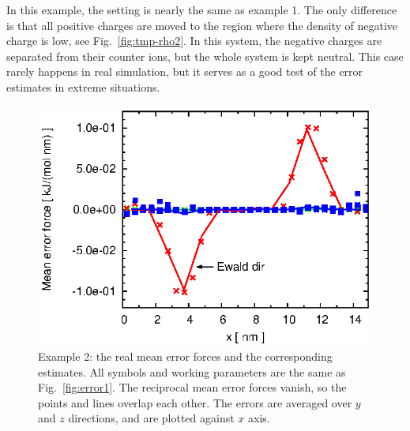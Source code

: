 \documentclass[aps,pre,preprint]{revtex4}
\begin{document}
In this example, the setting is nearly the same as
example 1. The only difference is that all positive charges
are moved to the region where the density of negative charge is low,
see Fig.~\ref{fig:tmp-rho2}.
In this system, the negative charges are separated from their
counter ions, but the whole system is kept neutral. This case rarely
happens in real simulation, but it serves as a good test of the error
estimates in extreme situations.

\begin{figure}
  \centering
  \includegraphics[]{fig.new/fig.rand2.meanf.eps}
  \caption{
    Example 2: the real mean error forces and the corresponding
    estimates. All symbols and working parameters are the same
    as     Fig.~\ref{fig:error1}.
    The reciprocal mean error forces vanish, so the points and lines
    overlap each other. 
    The errors are averaged over $y$ and $z$ directions, and are
    plotted against $x$ axis.
    }
  \label{fig:meanf2}
\end{figure}
\end{document}
